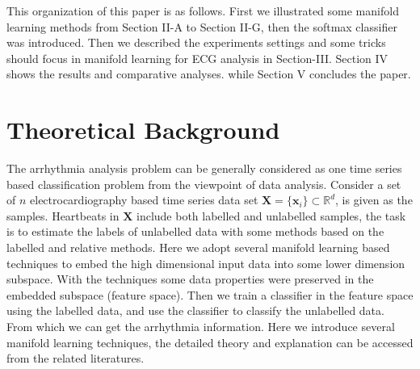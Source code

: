 \documentclass[journal]{IEEEtran}
\begin{document}
This organization of this paper is as follows. First we illustrated some manifold learning methods from Section II-A to Section II-G, then the softmax classifier was introduced. Then we described the experiments settings and some tricks should focus in manifold learning for ECG analysis in Section-III. Section IV shows the results and comparative analyses. while Section V concludes the paper.





%
%

\section{Theoretical Background}
The arrhythmia analysis problem can be generally considered as one time series based classification problem from the viewpoint of data analysis.
Consider a set of $n$ electrocardiography based time series data set $\boldsymbol{X} = \{\boldsymbol{x}_i\} \subset \mathbb{R}^d$, is given as the samples.
Heartbeats in $\boldsymbol{X}$ include both labelled and unlabelled samples, the task is to estimate the labels of unlabelled data with some methods based on the labelled and relative methods.
Here we adopt several manifold learning based techniques to embed the high dimensional input data into some lower dimension subspace. 
With the techniques some data properties were preserved in the embedded subspace (feature space).
Then we train a classifier in the feature space using the labelled data, and use the classifier to classify the unlabelled data. From which we can get the arrhythmia information. 
Here we introduce several manifold learning techniques, the detailed theory and explanation can be accessed from the related literatures.
\end{document}
